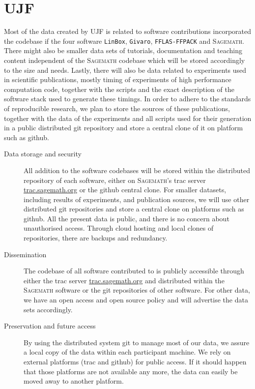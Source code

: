\documentclass[12pt]{article}
\newcommand{\software}[1]{\textsc{#1}\xspace}
\newcommand{\Sage}{\software{Sagemath}}
\begin{document}
\section{UJF}

Most of the data created by UJF is related to software contributions
incorporated the codebase if the four software \texttt{LinBox}, \texttt{Givaro},
\texttt{FFLAS-FFPACK} and \Sage. 
There might also be smaller data sets of tutorials, documentation and teaching
content independent of the \Sage codebase which will be stored accordingly to
the size and needs.
Lastly, there will also be data related to experiments used in scientific
publications, mostly timing of experiments of high performance computation code,
together with the scripts and the exact description of the software stack used
to generate these timings.
In order to adhere to the standards of reproducible research, we plan to store the
sources of these publications, together with the data of the experiments and all
scripts used for their generation in a public distributed git repository and
store a central clone of it on platform such as github.

\begin{description}
\item[Data storage and security] All addition to the software codebases will be
  stored within the distributed repository of each software, either on \Sage's trac server
  \href{http://trac.sagemath.org/}{trac.sagemath.org} or the github central
  clone. For smaller datasets, including results of experiments, and publication
  sources, we will use other distributed git repositories and store a central clone on
  platforms such as github. All the present data is public, and there is no
  concern about unauthorised access. Through cloud hosting and local clones of
repositories, there are backups and redundancy.
\item[Dissemination] The codebase of all software contributed to is publicly  accessible through either the trac server
  \href{http://trac.sagemath.org/}{trac.sagemath.org} and distributed within the
  \Sage software or the git repositories of other software. For other data, we have an open access and open source policy and will advertise the data sets accordingly.
\item[Preservation and future access] By using the distributed system git to manage most of our data, we assure a local copy of the data within each participant machine. We rely on external platforms (trac and github) for public access. If it should happen that those platforms are not available any more, the data can easily be moved away to another platform.
\end{description}
\end{document}
